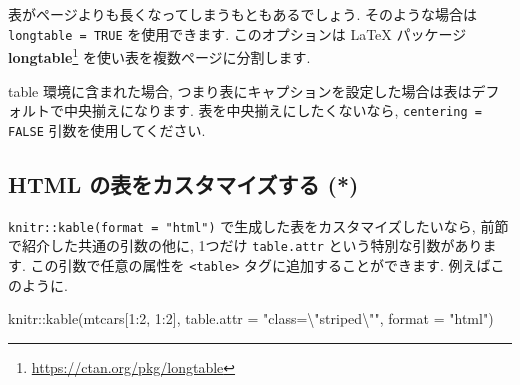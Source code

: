 \documentclass[
  11pt,
  lualatex,
  ja=standard]{bxjsreport}
\newenvironment{Shaded}{\begin{snugshade}}{\end{snugshade}}
\newcommand{\AttributeTok}[1]{\textcolor[rgb]{0.77,0.63,0.00}{#1}}
\newcommand{\DecValTok}[1]{\textcolor[rgb]{0.00,0.00,0.81}{#1}}
\newcommand{\FunctionTok}[1]{\textcolor[rgb]{0.00,0.00,0.00}{#1}}
\newcommand{\NormalTok}[1]{#1}
\newcommand{\SpecialCharTok}[1]{\textcolor[rgb]{0.00,0.00,0.00}{#1}}
\newcommand{\StringTok}[1]{\textcolor[rgb]{0.31,0.60,0.02}{#1}}
\renewcommand{\href}[2]{#2\footnote{\url{#1}}}
\begin{document}
表がページよりも長くなってしまうもともあるでしょう. そのような場合は \texttt{longtable = TRUE} を使用できます. このオプションは LaTeX パッケージ \href{https://ctan.org/pkg/longtable}{\textbf{longtable}} を使い表を複数ページに分割します.

table 環境に含まれた場合, つまり表にキャプションを設定した場合は表はデフォルトで中央揃えになります. 表を中央揃えにしたくないなら, \texttt{centering = FALSE} 引数を使用してください.

\hypertarget{customize-html-tables}{%
\subsection{HTML の表をカスタマイズする (*)}\label{customize-html-tables}}

\texttt{knitr::kable(format = "html")} で生成した表をカスタマイズしたいなら, 前節で紹介した共通の引数の他に, 1つだけ \texttt{table.attr} という特別な引数があります. この引数で任意の属性を \texttt{\textless{}table\textgreater{}} タグに追加することができます. 例えばこのように.

\begin{Shaded}
\begin{Highlighting}[numbers=left,,]
\NormalTok{knitr}\SpecialCharTok{::}\FunctionTok{kable}\NormalTok{(mtcars[}\DecValTok{1}\SpecialCharTok{:}\DecValTok{2}\NormalTok{, }\DecValTok{1}\SpecialCharTok{:}\DecValTok{2}\NormalTok{], }\AttributeTok{table.attr =} \StringTok{"class=}\SpecialCharTok{\textbackslash{}"}\StringTok{striped}\SpecialCharTok{\textbackslash{}"}\StringTok{"}\NormalTok{, }
  \AttributeTok{format =} \StringTok{"html"}\NormalTok{)}
\end{Highlighting}
\end{Shaded}
\end{document}
